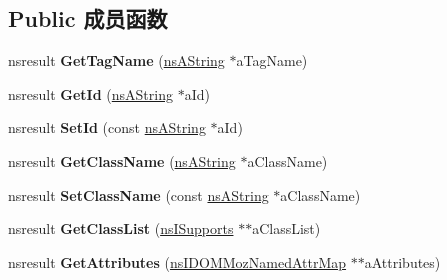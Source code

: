 \subsection*{Public 成员函数}
\begin{DoxyCompactItemize}
\item 
\mbox{\label{interfacens_i_d_o_m_element_a535d93fb7cd6ad0791d2168459af74f1}} 
nsresult {\bfseries Get\+Tag\+Name} (\hyperlink{structns_string_container}{ns\+A\+String} $\ast$a\+Tag\+Name)
\item 
\mbox{\label{interfacens_i_d_o_m_element_ac72c0bf4464dc75f378ffa16febdcf19}} 
nsresult {\bfseries Get\+Id} (\hyperlink{structns_string_container}{ns\+A\+String} $\ast$a\+Id)
\item 
\mbox{\label{interfacens_i_d_o_m_element_ac2bf7dea798be64a37ab835161881641}} 
nsresult {\bfseries Set\+Id} (const \hyperlink{structns_string_container}{ns\+A\+String} $\ast$a\+Id)
\item 
\mbox{\label{interfacens_i_d_o_m_element_adb7c3f297f59dfa3f379116a23d41d88}} 
nsresult {\bfseries Get\+Class\+Name} (\hyperlink{structns_string_container}{ns\+A\+String} $\ast$a\+Class\+Name)
\item 
\mbox{\label{interfacens_i_d_o_m_element_a9e7f3770b7660e95d34acdd575c02ae2}} 
nsresult {\bfseries Set\+Class\+Name} (const \hyperlink{structns_string_container}{ns\+A\+String} $\ast$a\+Class\+Name)
\item 
\mbox{\label{interfacens_i_d_o_m_element_ad0a1de7e4f3cb5900961b050dd7ef1fe}} 
nsresult {\bfseries Get\+Class\+List} (\hyperlink{interfacens_i_supports}{ns\+I\+Supports} $\ast$$\ast$a\+Class\+List)
\item 
\mbox{\label{interfacens_i_d_o_m_element_a113c51a4320d3e1b78f1da25b9dc0692}} 
nsresult {\bfseries Get\+Attributes} (\hyperlink{interfacens_i_d_o_m_moz_named_attr_map}{ns\+I\+D\+O\+M\+Moz\+Named\+Attr\+Map} $\ast$$\ast$a\+Attributes)
\item 
\mbox{\label{interfacens_i_d_o_m_element_ab0f3effb28207d3bcfc97df09a9f5284}} 

\end{DoxyCompactItemize}
